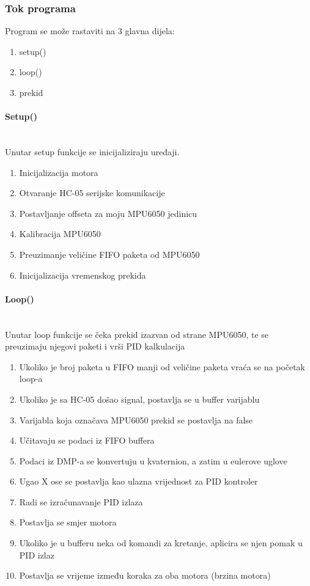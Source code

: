 \documentclass[../Document.tex]{subfiles}
\begin{document}
\subsubsection{Tok programa}
Program se može rastaviti na 3 glavna dijela:

\begin{enumerate}
    \item setup()
    \item loop()
    \item prekid
\end{enumerate}

\paragraph{Setup()}\mbox{}\\
\noindent Unutar setup funkcije se inicijaliziraju uređaji.

\begin{enumerate}
    \item Inicijalizacija motora
    \item Otvaranje HC-05 serijske komunikacije
    \item Postavljanje offseta za moju MPU6050 jedinicu
    \item Kalibracija MPU6050
    \item Preuzimanje veličine FIFO paketa od MPU6050
    \item Inicijalizacija vremenskog prekida
\end{enumerate}

\paragraph{Loop()}\mbox{}\\
\noindent Unutar loop funkcije se čeka prekid izazvan od strane MPU6050, te se preuzimaju njegovi paketi i vrši PID kalkulacija

\begin{enumerate}
    \item Ukoliko je broj paketa u FIFO manji od veličine paketa vraća se na početak loop-a
    \item Ukoliko je sa HC-05 došao signal, postavlja se u buffer varijablu
    \item Varijabla koja označava MPU6050 prekid se postavlja na false
    \item Učitavaju se podaci iz FIFO buffera
    \item Podaci iz DMP-a se konvertuju u kvaternion, a zatim u eulerove uglove
    \item Ugao X ose se postavlja kao ulazna vrijednost za PID kontroler
    \item Radi se izračunavanje PID izlaza
    \item Postavlja se smjer motora
    \item Ukoliko je u bufferu neka od komandi za kretanje, aplicira se njen pomak u PID izlaz
    \item Postavlja se vrijeme između koraka za oba motora (brzina motora)
\end{enumerate}
\end{document}
